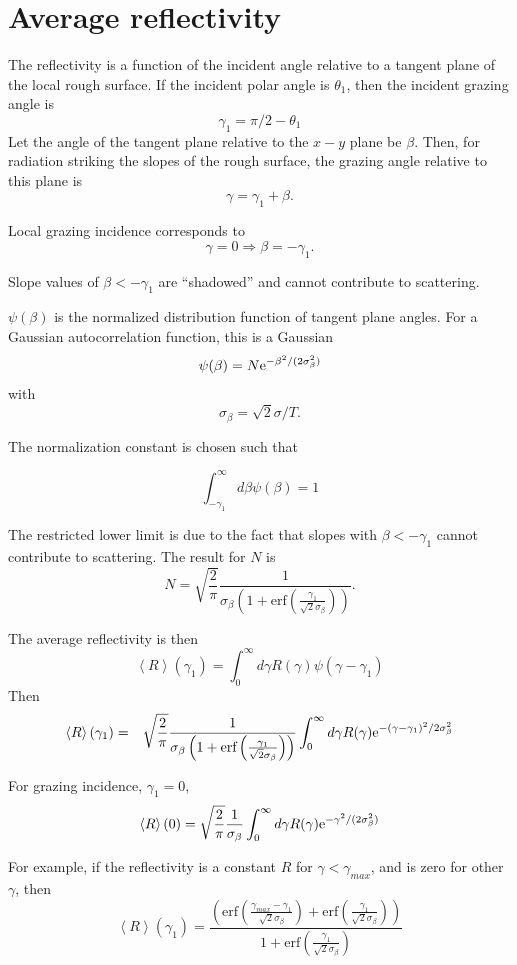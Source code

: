 \documentclass[11pt,openany]{report}
\newcommand{\e}{{\rm e}}
\begin{document}
{{%
\section{Average reflectivity}

The reflectivity is a function of the incident angle relative to a
tangent plane of the local rough surface. If the incident polar angle
is $\theta_{1}$, then the incident grazing angle is
  $$\gamma_{1}=\pi/2-\theta_{1}$$
Let the angle of the tangent plane relative to the $x-y$ plane be
$\beta$. Then, for radiation striking the slopes of the rough surface,
the grazing angle relative to this plane is
  $$\gamma=\gamma_{1}+\beta.$$

Local grazing incidence corresponds to $$\gamma=0\Rightarrow \beta=-\gamma_{1}.$$

Slope values of $\beta <-\gamma_{1}$ are ``shadowed'' and cannot contribute to scattering.

$\psi(\beta)$ is the normalized distribution function of tangent plane
angles. For a Gaussian autocorrelation function, this is a Gaussian
  $$\psi(\beta)=N\e^{-\beta^{2}/(2\sigma_{\beta}^{2})}$$
with
  $$\sigma_{\beta}=\sqrt{2}\sigma/T.$$

The normalization constant is chosen such that 

$$\int_{-\gamma_{1}}^{\infty}d\beta\psi(\beta)=1$$

The restricted lower limit is due to the fact that slopes with $\beta
<-\gamma_{1}$ cannot contribute to scattering.  The result for $N$ is
$$N=\sqrt{\frac{2}{\pi}}\frac{1}{\sigma_{\beta}
\left(1+\textrm{erf}\left(\frac{\gamma_{1}}{\sqrt{2}\sigma_{\beta}}\right)\right)}.$$

The average reflectivity is then
  $$\left<R\right>(\gamma_{1})=\int_{0}^{\infty} d\gamma R(\gamma)\psi(\gamma-\gamma_{1})$$
Then
  \begin{eqnarray}
\left<R\right>(\gamma_{1})&=&
\sqrt{\frac{2}{\pi}}\frac{1}{\sigma_{\beta}\left(1+\textrm{erf}
\left(\frac{\gamma_{1}}{\sqrt{2}\sigma_{\beta}}\right)\right)}
\int_{0}^{\infty} d\gamma R(\gamma)\e^{-(\gamma-\gamma_{1})^{2}/2\sigma_{\beta}^{2}}\\
  \end{eqnarray}


For grazing incidence, $\gamma_{1}=0$,
$$\left<R\right>(0)=
\sqrt{\frac{2}{\pi}}\frac{1}{\sigma_{\beta}}\int_{0}^{\infty} d\gamma R(\gamma)\e^{-\gamma^{2}/(2\sigma_{\beta}^{2})}$$

For example, if the reflectivity is a constant $R$ for $\gamma<\gamma_{max}$, and is zero for other $\gamma$, then
  $$\left<R\right>(\gamma_{1})=
\frac{\left(\textrm{erf}\left(\frac{\gamma_{max}-\gamma_{1}}{\sqrt{2}\sigma_{\beta}}\right)+
\textrm{erf}\left(\frac{\gamma_{1}}{\sqrt{2}\sigma_{\beta}}\right)\right)}{1+\textrm{erf}
\left(\frac{\gamma_{1}}{\sqrt{2}\sigma_{\beta}}\right)}$$

}}
\end{document}

